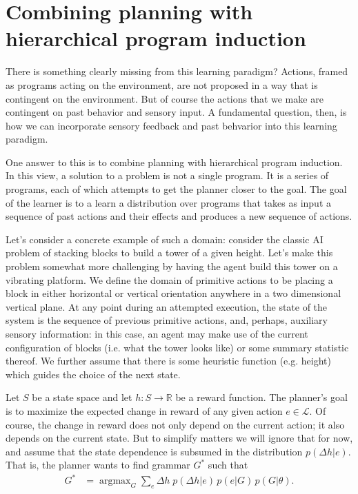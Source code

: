 \documentclass{article}
\DeclareMathOperator*{\argmax}{argmax}
\begin{document}
\section{Combining planning with hierarchical program induction}
There is something clearly missing from this learning paradigm?
Actions, framed as programs acting on the environment, are not
proposed in a way that is contingent on the environment. But of course
the actions that we make are contingent on past behavior and sensory
input. A fundamental question, then, is how we can incorporate sensory
feedback and past behvarior into this learning paradigm. 

One answer to this is to combine planning with hierarchical program
induction. In this view, a solution to a problem is not a single
program. It is a series of programs, each of which attempts to get the
planner closer to the goal. The goal of the learner is to a learn a
distribution over programs that takes as input a sequence of past
actions and their effects and produces a new sequence of actions.

Let's consider a concrete example of such a domain: consider the
classic AI problem of stacking blocks to build a tower of a given
height. Let's make this problem somewhat more challenging by having
the agent build this tower on a vibrating platform. We define the
domain of primitive actions to be placing a block in either horizontal
or vertical orientation anywhere in a two dimensional vertical
plane. At any point during an attempted execution, the state of the
system is the sequence of previous primitive actions, and, perhaps,
auxiliary sensory information: in this case, an agent may make use of
the current configuration of blocks (i.e. what the tower looks like)
or some summary statistic thereof. We further assume that there is
some heuristic function (e.g. height) which guides the choice of the
next state.

Let $S$ be a state space and let $h:S \rightarrow \mathbb{R}$ be a
reward function. The planner's goal is to maximize the expected change
in reward of any given action $e \in \mathcal{L}$. Of course, the
change in reward does not only depend on the current action; it also
depends on the current state. But to simplify matters we will ignore
that for now, and assume that the state dependence is subsumed in the
distribution $p(\Delta h | e)$. That is, the planner wants to find
grammar $G^*$ such that
\begin{align}
G^* &= \argmax_G \sum_e \Delta h \;p(\Delta h | e) \, p(e|G) \, p(G|\theta).
\end{align}
\end{document}
